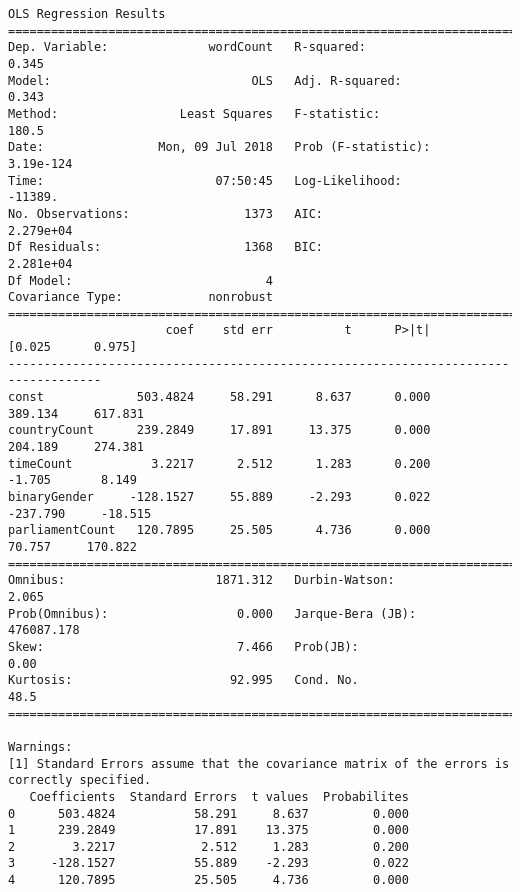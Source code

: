 \documentclass[11pt]{article}
\begin{document}
    \begin{Verbatim}[commandchars=\\\{\}]
                            OLS Regression Results                            
==============================================================================
Dep. Variable:              wordCount   R-squared:                       0.345
Model:                            OLS   Adj. R-squared:                  0.343
Method:                 Least Squares   F-statistic:                     180.5
Date:                Mon, 09 Jul 2018   Prob (F-statistic):          3.19e-124
Time:                        07:50:45   Log-Likelihood:                -11389.
No. Observations:                1373   AIC:                         2.279e+04
Df Residuals:                    1368   BIC:                         2.281e+04
Df Model:                           4                                         
Covariance Type:            nonrobust                                         
===================================================================================
                      coef    std err          t      P>|t|      [0.025      0.975]
-----------------------------------------------------------------------------------
const             503.4824     58.291      8.637      0.000     389.134     617.831
countryCount      239.2849     17.891     13.375      0.000     204.189     274.381
timeCount           3.2217      2.512      1.283      0.200      -1.705       8.149
binaryGender     -128.1527     55.889     -2.293      0.022    -237.790     -18.515
parliamentCount   120.7895     25.505      4.736      0.000      70.757     170.822
==============================================================================
Omnibus:                     1871.312   Durbin-Watson:                   2.065
Prob(Omnibus):                  0.000   Jarque-Bera (JB):           476087.178
Skew:                           7.466   Prob(JB):                         0.00
Kurtosis:                      92.995   Cond. No.                         48.5
==============================================================================

Warnings:
[1] Standard Errors assume that the covariance matrix of the errors is correctly specified.
   Coefficients  Standard Errors  t values  Probabilites
0      503.4824           58.291     8.637         0.000
1      239.2849           17.891    13.375         0.000
2        3.2217            2.512     1.283         0.200
3     -128.1527           55.889    -2.293         0.022
4      120.7895           25.505     4.736         0.000

    \end{Verbatim}
\end{document}
